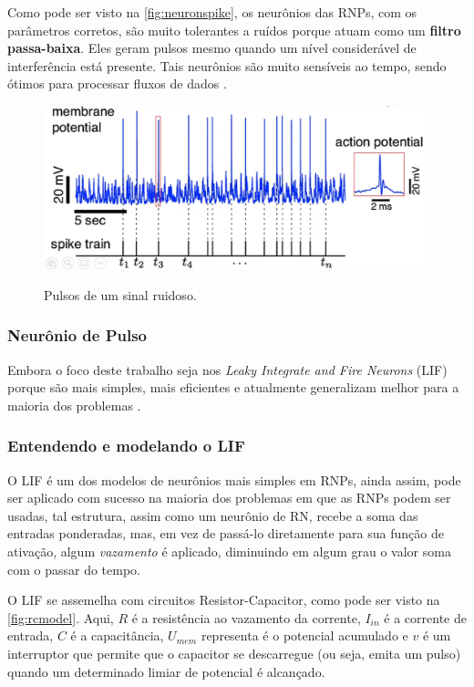 			\par Como pode ser visto na \autoref{fig:neuronspike}, os neurônios das RNPs, com os parâmetros corretos, são muito tolerantes a ruídos porque atuam como um \textbf{filtro passa-baixa}. Eles geram pulsos mesmo quando um nível considerável de interferência está presente. Tais neurônios são muito sensíveis ao tempo, sendo ótimos para processar fluxos de dados \cite{10242251}.
			
			\begin{figure}[H]
				\centering
				\caption{Pulsos de um sinal ruidoso.}
				\includegraphics[width=0.7\linewidth]{images/neuronSpikes}
				\label{fig:neuronspike}
			\end{figure}
				
			\subsubsection{Neurônio de Pulso}
				\par Embora o foco deste trabalho seja nos \textit{Leaky Integrate and Fire Neurons} (LIF) porque são mais simples, mais eficientes e atualmente generalizam melhor para a maioria dos problemas \cite{dan_goodman_2022_7044500}.
		
		\subsubsection{Entendendo e modelando o LIF}
			
			\par O LIF é um dos modelos de neurônios mais simples em RNPs, ainda assim, pode ser aplicado com sucesso na maioria dos problemas em que as RNPs podem ser usadas, tal estrutura, assim como um neurônio de RN, recebe a soma das entradas ponderadas, mas, em vez de passá-lo diretamente para sua função de ativação, algum \textit{vazamento} é aplicado, diminuindo em algum grau o valor soma com o passar do tempo.
			
			\par O LIF se assemelha com circuitos Resistor-Capacitor, como pode ser visto na  \autoref{fig:rcmodel}. Aqui, $R$ é a resistência ao vazamento da corrente, $I_{in}$ é a corrente de entrada, $C$ é a capacitância, $U_{mem}$ representa é o potencial acumulado e $v$ é um interruptor que permite que o capacitor se descarregue (ou seja, emita um pulso) quando um determinado limiar de potencial é alcançado.
			
